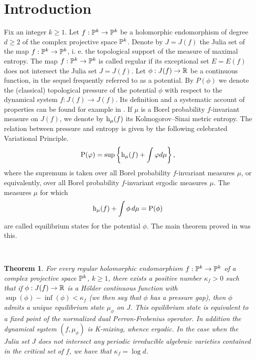 \documentclass[12pt]{amsart}
\numberwithin{equation}{section}
\newcommand{\bthm}{\begin{thm}}
\newcommand{\ethm}{\end{thm}}
\newcommand{\nl}{\newline}
\newtheorem{thm}{Theorem}[section]
\def\h{{\text h}}
\def\hmu{\h_\mu}           \def\htop{{\text h_{\text{top}}}}
\def\ka{\kappa}
\def\lt{\left}                \def\rt{\right}
\def\sp{\medskip}             \def\fr{\noindent}        \def\nl{\newline}
\begin{document}
\maketitle

\section{Introduction}

\sp\fr Fix an integer $k\ge 1$. Let $f:{\mathbb P}^k\to{\mathbb P}^k$ be a holomorphic
endomorphism of degree $d\ge 2$ of the complex projective space ${\mathbb P}^k$.
Denote by $J=J(f)$ the Julia set of the map $f:{\mathbb P}^k\to{\mathbb P}^k$, i. e.
the topological support of the measure of maximal entropy. The map
$f:{\mathbb P}^k\to{\mathbb P}^k$ is called regular if its exceptional set $E=E(f)$ does
not intersect the Julia set $J=J(f)$. Let $\phi:J(f)\to{\mathbb R}$ be a
continuous function, in the 
sequel frequently referred to as a potential. By $P(\phi)$  
we denote the (classical) topological pressure of the potential $\phi$
with respect to the dynamical system $f:J(f)\to J(f)$. Its definition
and a systematic account of properties can be found for example in
\cite{PU}.  If $\mu$ is a Borel probability $f$-invariant measure on
$J(f)$, we denote by $\hmu(f)$ its Kolmogorov--Sinai metric entropy. The
relation between pressure and entropy is given by the following celebrated
Variational Principle.
\begin{equation}\label{VP}
\P(\varphi)=\sup\lt\{\hmu(f)+\int\varphi d\mu\rt\},
\end{equation}
where the supremum is taken over all Borel probability $f$-invariant
measures $\mu$, or equivalently, over all Borel probability
$f$-invariant ergodic measures $\mu$. The measures $\mu$ for which 
$$
\hmu(f)+\int\phi\, d\mu=\P(\phi)
$$ 
are called equilibrium states for the potential
$\phi$. The main theorem proved in \cite{uzpk} was this.

\

\bthm\label{AA}
For every  regular holomorphic endomorphism $f:{\mathbb P}^k\to{\mathbb P}^k$ of a complex
projective space ${\mathbb P}^k$, $k\ge 1$, there exists a positive number
$\ka_f>0$ such that if $\phi:J(f)\to{\mathbb R}$ is a H\"older continuous
function with $\sup(\phi)-\inf(\phi)<\ka_f$ (we then say that $\phi$
has a pressure gap), then $\phi$ admits a
unique equilibrium state $\mu_\phi$ on $J$. This equilibrium state is
equivalent to a fixed point of the normalized dual Perron-Frobenius
operator. In addition the
dynamical system $(f,\mu_\phi)$ is K-mixing, whence ergodic. In the
case when the Julia set $J$ does not intersect any periodic
irreducible algebraic varieties contained in the critical set of $f$,
we have that $\ka_f=\log d$.
\ethm
\end{document}
